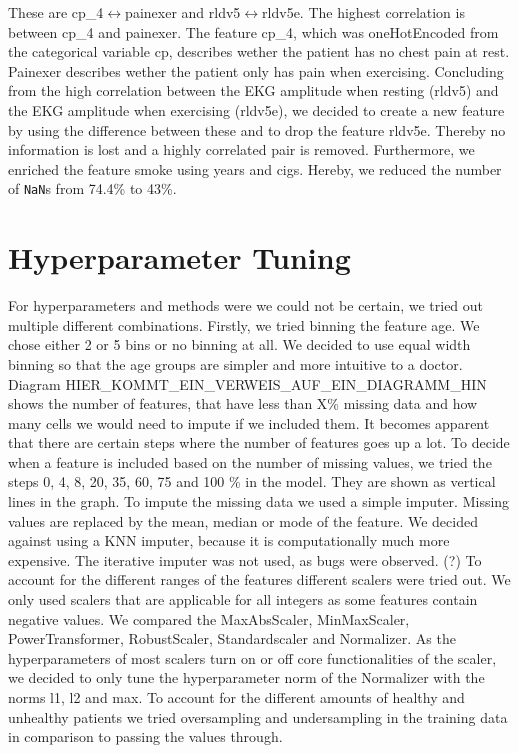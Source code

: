 These are cp\_4$\leftrightarrow$painexer and rldv5$\leftrightarrow$rldv5e. The highest correlation is between cp\_4 and painexer. The feature cp\_4, which was oneHotEncoded from the categorical variable cp, describes wether the patient has no chest pain at rest. Painexer describes wether the patient only has pain when exercising. 
Concluding from the high correlation between the EKG amplitude when resting (rldv5) and the EKG amplitude when exercising (rldv5e), we decided to create a new feature by using the difference between these and to drop the feature rldv5e. Thereby no information is lost and a highly correlated pair is removed. Furthermore, we enriched the feature smoke using years and cigs. Hereby, we reduced the number of \texttt{NaN}s from 74.4\% to 43\%. 

\section{Hyperparameter Tuning }
For hyperparameters and methods were we could not be certain, we tried out multiple different combinations.
Firstly, we tried binning the feature age. We chose either 2 or 5 bins or no binning at all. We decided to use equal width binning so that the age groups are simpler and more intuitive to a doctor.
Diagram HIER\_KOMMT\_EIN\_VERWEIS\_AUF\_EIN\_DIAGRAMM\_HIN shows the number of features, that have less than X\% missing data and how many cells we would need to impute if we included them. It becomes apparent that there are certain steps where the number of features goes up a lot. To decide when a feature is included based on the number of missing values, we tried the steps 0, 4, 8, 20, 35, 60, 75 and 100 \% in the model. They are shown as vertical lines in the graph.
To impute the missing data we used a simple imputer. Missing values are replaced by the mean, median or mode of the feature. We decided against using a KNN imputer, because it is computationally much more expensive. The iterative imputer was not used, as bugs were observed. (?)
To account for the different ranges of the features different scalers were tried out. We only used scalers that are applicable for all integers as some features contain negative values. 
We compared the MaxAbsScaler, MinMaxScaler, PowerTransformer, RobustScaler, Standardscaler and Normalizer. As the hyperparameters of most scalers turn on or off core functionalities of the scaler, we decided to only tune the hyperparameter norm of the Normalizer with the norms l1, l2 and max.
To account for the different amounts of healthy and unhealthy patients we tried oversampling and undersampling in the training data in comparison to passing the values through.




